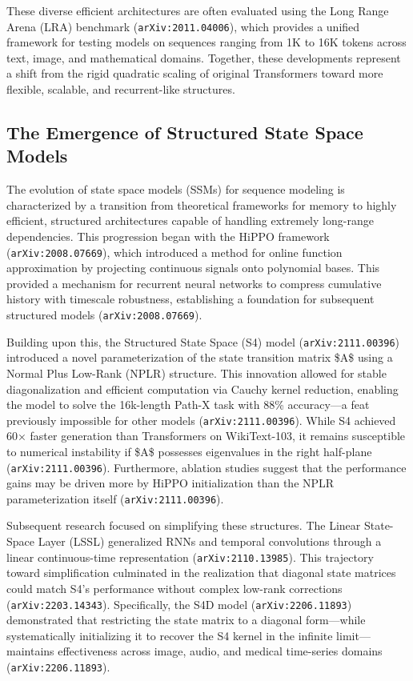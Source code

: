 \documentclass[11pt]{article}
\begin{document}
These diverse efficient architectures are often evaluated using the Long Range Arena (LRA) benchmark (\texttt{arXiv:2011.04006}), which provides a unified framework for testing models on sequences ranging from 1K to 16K tokens across text, image, and mathematical domains. Together, these developments represent a shift from the rigid quadratic scaling of original Transformers toward more flexible, scalable, and recurrent-like structures.

\subsection{The Emergence of Structured State Space Models}

The evolution of state space models (SSMs) for sequence modeling is characterized by a transition from theoretical frameworks for memory to highly efficient, structured architectures capable of handling extremely long-range dependencies. This progression began with the HiPPO framework (\texttt{arXiv:2008.07669}), which introduced a method for online function approximation by projecting continuous signals onto polynomial bases. This provided a mechanism for recurrent neural networks to compress cumulative history with timescale robustness, establishing a foundation for subsequent structured models (\texttt{arXiv:2008.07669}).

Building upon this, the Structured State Space (S4) model (\texttt{arXiv:2111.00396}) introduced a novel parameterization of the state transition matrix \$A\$ using a Normal Plus Low-Rank (NPLR) structure. This innovation allowed for stable diagonalization and efficient computation via Cauchy kernel reduction, enabling the model to solve the 16k-length Path-X task with 88\% accuracy—a feat previously impossible for other models (\texttt{arXiv:2111.00396}). While S4 achieved 60× faster generation than Transformers on WikiText-103, it remains susceptible to numerical instability if \$A\$ possesses eigenvalues in the right half-plane (\texttt{arXiv:2111.00396}). Furthermore, ablation studies suggest that the performance gains may be driven more by HiPPO initialization than the NPLR parameterization itself (\texttt{arXiv:2111.00396}).

Subsequent research focused on simplifying these structures. The Linear State-Space Layer (LSSL) generalized RNNs and temporal convolutions through a linear continuous-time representation (\texttt{arXiv:2110.13985}). This trajectory toward simplification culminated in the realization that diagonal state matrices could match S4's performance without complex low-rank corrections (\texttt{arXiv:2203.14343}). Specifically, the S4D model (\texttt{arXiv:2206.11893}) demonstrated that restricting the state matrix to a diagonal form—while systematically initializing it to recover the S4 kernel in the infinite limit—maintains effectiveness across image, audio, and medical time-series domains (\texttt{arXiv:2206.11893}).
\end{document}
